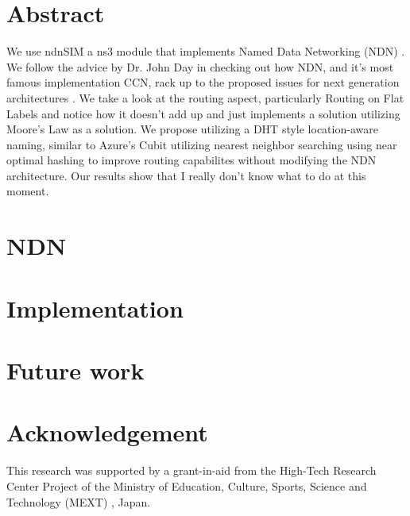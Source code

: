 \documentclass[8pt,twocolumn]{article}
\begin{document}

\section{Abstract}
We use ndnSIM \cite{ndn367} a ns3 \cite{riley:ns3} \cite{ns3:2014:Online}
module that implements Named Data Networking (NDN)
 \cite{Jacobson:2009:NNC:1658939.1658941}. We follow the advice by Dr. John
Day in checking out how NDN, and it's most famous implementation CCN, rack
up to the proposed issues for next generation architectures 
\cite{Day:2008:PNA:1349793}. We take a look at the routing aspect, particularly
Routing on Flat Labels \cite{Caesar06rofl:routing} and notice how it doesn't
add up and just implements a solution utilizing Moore's Law as a solution. We
propose utilizing a DHT style location-aware naming, similar to Azure's
Cubit \cite{WongSirer2008ApproximateMatching} utilizing nearest neighbor 
searching using near optimal hashing \cite{Andoni06near-optimalhashing} to 
improve routing capabilites without modifying the NDN architecture. Our results
show that I really don't know what to do at this moment. 

\section{NDN}
\section{Implementation}
\section{Future work}

\section*{Acknowledgement}
This research was supported by a grant-in-aid from the High-Tech Research
Center Project of the Ministry of Education, Culture, Sports, Science and
Technology (MEXT) \cite{mext:2014:Online}, Japan.



\end{document}
